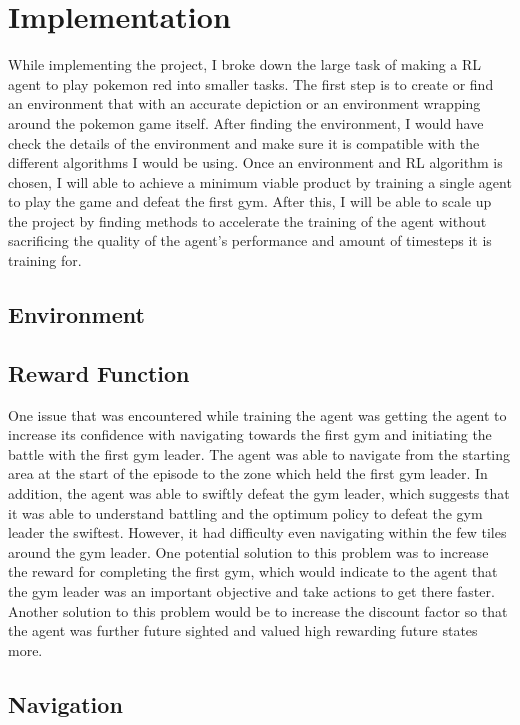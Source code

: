 \section{Implementation}

While implementing the project, I broke down the large task of making a RL agent to play pokemon red into smaller tasks. The first step is to create or find an environment that with an accurate depiction or an environment wrapping around the pokemon game itself. After finding the environment, I would have check the details of the environment and make sure it is compatible with the different algorithms I would be using. Once an environment and RL algorithm is chosen, I will able to achieve a minimum viable product by training a single agent to play the game and defeat the first gym. After this, I will be able to scale up the project by finding methods to accelerate the training of the agent without sacrificing the quality of the agent's performance and amount of timesteps it is training for. 

\subsection{Environment}



\subsection{Reward Function}

One issue that was encountered while training the agent was getting the agent to increase its confidence with navigating towards the first gym and initiating the battle with the first gym leader. The agent was able to navigate from the starting area at the start of the episode to the zone which held the first gym leader. In addition, the agent was able to swiftly defeat the gym leader, which suggests that it was able to understand battling and the optimum policy to defeat the gym leader the swiftest. However, it had difficulty even navigating within the few tiles around the gym leader. One potential solution to this problem was to increase the reward for completing the first gym, which would indicate to the agent that the gym leader was an important objective and take actions to get there faster. Another solution to this problem would be to increase the discount factor so that the agent was further future sighted and valued high rewarding future states more. 

\subsection{Navigation}

